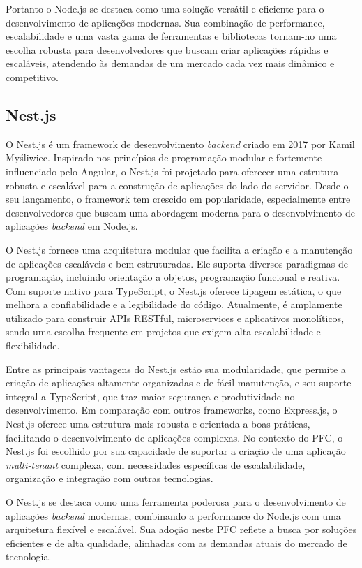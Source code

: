 Portanto o Node.js se destaca como uma solução versátil e eficiente para o desenvolvimento de aplicações modernas. Sua combinação de performance, escalabilidade e uma vasta gama de ferramentas e bibliotecas tornam-no uma escolha robusta para desenvolvedores que buscam criar aplicações rápidas e escaláveis, atendendo às demandas de um mercado cada vez mais dinâmico e competitivo.

\subsection{Nest.js}

O Nest.js é um framework de desenvolvimento \textit{backend} criado em 2017 por Kamil Myśliwiec. Inspirado nos princípios de programação modular e fortemente influenciado pelo Angular, o Nest.js foi projetado para oferecer uma estrutura robusta e escalável para a construção de aplicações do lado do servidor. Desde o seu lançamento, o framework tem crescido em popularidade, especialmente entre desenvolvedores que buscam uma abordagem moderna para o desenvolvimento de aplicações \textit{backend} em Node.js.

O Nest.js fornece uma arquitetura modular que facilita a criação e a manutenção de aplicações escaláveis e bem estruturadas. Ele suporta diversos paradigmas de programação, incluindo orientação a objetos, programação funcional e reativa. Com suporte nativo para TypeScript, o Nest.js oferece tipagem estática, o que melhora a confiabilidade e a legibilidade do código. Atualmente, é amplamente utilizado para construir APIs RESTful, microservices e aplicativos monolíticos, sendo uma escolha frequente em projetos que exigem alta escalabilidade e flexibilidade.

Entre as principais vantagens do Nest.js estão sua modularidade, que permite a criação de aplicações altamente organizadas e de fácil manutenção, e seu suporte integral a TypeScript, que traz maior segurança e produtividade no desenvolvimento. Em comparação com outros frameworks, como Express.js, o Nest.js oferece uma estrutura mais robusta e orientada a boas práticas, facilitando o desenvolvimento de aplicações complexas. No contexto do \acrlong{PFC}, o Nest.js foi escolhido por sua capacidade de suportar a criação de uma aplicação \textit{multi-tenant} complexa, com necessidades específicas de escalabilidade, organização e integração com outras tecnologias.

O Nest.js se destaca como uma ferramenta poderosa para o desenvolvimento de aplicações \textit{backend} modernas, combinando a performance do Node.js com uma arquitetura flexível e escalável. Sua adoção neste \acrlong{PFC} reflete a busca por soluções eficientes e de alta qualidade, alinhadas com as demandas atuais do mercado de tecnologia.

